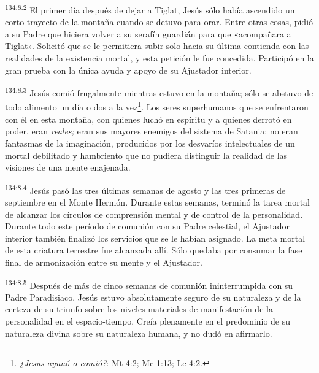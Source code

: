 \par 
\textsuperscript{134:8.2} El primer día después de dejar a Tiglat, Jesús sólo había ascendido un corto trayecto de la montaña cuando se detuvo para orar. Entre otras cosas, pidió a su Padre que hiciera volver a su serafín guardián para que «acompañara a Tiglat». Solicitó que se le permitiera subir solo hacia su última contienda con las realidades de la existencia mortal, y esta petición le fue concedida. Participó en la gran prueba con la única ayuda y apoyo de su Ajustador interior.

\par 
\textsuperscript{134:8.3} Jesús comió frugalmente mientras estuvo en la montaña; sólo se abstuvo de todo alimento un día o dos a la vez\footnote{\textit{¿Jesus ayunó o comió?}: Mt 4:2; Mc 1:13; Lc 4:2.}. Los seres superhumanos que se enfrentaron con él en esta montaña, con quienes luchó en espíritu y a quienes derrotó en poder, eran \textit{reales;} eran sus mayores enemigos del sistema de Satania; no eran fantasmas de la imaginación, producidos por los desvaríos intelectuales de un mortal debilitado y hambriento que no pudiera distinguir la realidad de las visiones de una mente enajenada.

\par 
\textsuperscript{134:8.4} Jesús pasó las tres últimas semanas de agosto y las tres primeras de septiembre en el Monte Hermón. Durante estas semanas, terminó la tarea mortal de alcanzar los círculos de comprensión mental y de control de la personalidad. Durante todo este período de comunión con su Padre celestial, el Ajustador interior también finalizó los servicios que se le habían asignado. La meta mortal de esta criatura terrestre fue alcanzada allí. Sólo quedaba por consumar la fase final de armonización entre su mente y el Ajustador.

\par 
\textsuperscript{134:8.5} Después de más de cinco semanas de comunión ininterrumpida con su Padre Paradisiaco, Jesús estuvo absolutamente seguro de su naturaleza y de la certeza de su triunfo sobre los niveles materiales de manifestación de la personalidad en el espacio-tiempo. Creía plenamente en el predominio de su naturaleza divina sobre su naturaleza humana, y no dudó en afirmarlo.

